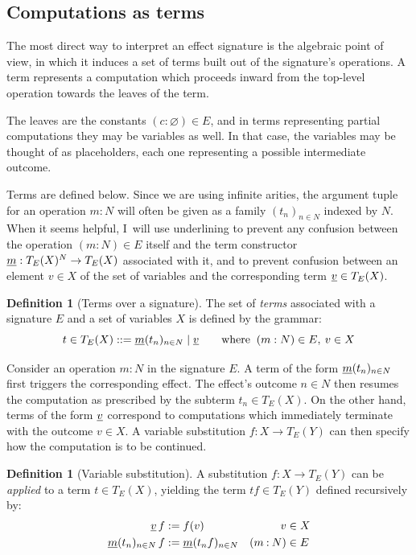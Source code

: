 \documentclass[11pt,oneside]{book}
\theoremstyle{definition}
\newtheorem{definition}[theorem]{Definition}
\newcommand{\ul}[1]{%
  \underline{\smash{#1}}
}
\begin{document}

\subsection{Computations as terms} \label{sec:bg:terms} %

The most direct way to interpret an effect signature
is the algebraic point of view,
in which it induces a set of terms
built out of the signature's operations.
A term represents a computation which proceeds inward
from the top-level operation
towards the leaves of the term.

The leaves are the constants $(c \mathbin: \varnothing) \in E$,
and in terms representing partial computations
they may be variables as well.
In that case,
the variables may be thought of as placeholders,
each one representing a possible intermediate outcome.

Terms are defined below.
Since we are using infinite arities,
the argument tuple for an operation $m \mathbin: N$
will often be given as a family $(t_n)_{n \in N}$
indexed by $N$.
When it seems helpful,
I~will use underlining
to prevent any confusion between
the operation $(m \mathbin: N) \in E$ itself
and the term constructor $\ul{m} : T_E(X)^N \rightarrow T_E(X)$
associated with it,
and to prevent confusion between an element $v \in X$ of the set of variables
and the corresponding term $\ul{v} \in T_E(X)$.

\begin{definition}[Terms over a signature] %
The set of \emph{terms} associated with
a signature $E$ and a set of variables $X$
is defined by the grammar:
\[
  t \in T_E(X) ::=
    \ul{m}(t_n)_{n \in N} \mid
    \ul{v}
  \qquad
  \text{where }
  \:
    (m : N) \in E, \:
    v \in X
\]
\end{definition}

Consider an operation $m \mathbin: N$ in the signature $E$.
A term of the form $\ul{m}(t_n)_{n \in N}$
first triggers the corresponding effect.
The effect's outcome $n \in N$ then resumes the computation
as prescribed by the subterm $t_n \in T_E(X)$.
On the other hand,
terms of the form $\ul{v}$ correspond to computations
which immediately terminate with the outcome $v \in X$.
A variable substitution $f : X \rightarrow T_E(Y)$
can then specify how the computation is to be continued.

\begin{definition}[Variable substitution] %
A substitution $f : X \rightarrow T_E(Y)$
can be \emph{applied} to a term $t \in T_E(X)$,
yielding the term $t f \in T_E(Y)$
defined recursively by:
\begin{align*}
  \ul{v} \, f &:= f(v) & v &\in X \\
  \ul{m}(t_n)_{n \in N} \, f &:=
    \ul{m}(t_n f)_{n \in N} & (m \mathbin: N) &\in E
\end{align*}
\end{definition}
\end{document}

